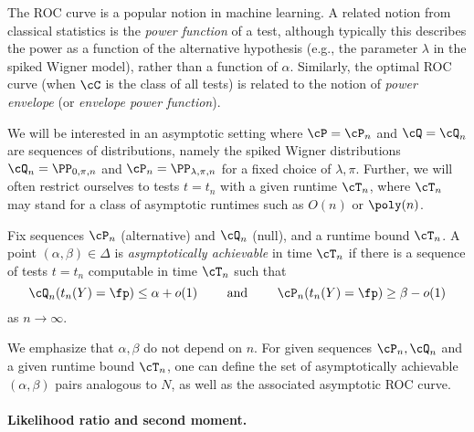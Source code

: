 \documentclass[11pt]{article}
\begin{document}
\begin{remark}[Terminology]
The ROC curve is a popular notion in machine learning. A related notion from classical statistics is the \emph{power function} of a test, although typically this describes the power as a function of the alternative hypothesis (e.g., the parameter $\lambda$ in the spiked Wigner model), rather than a function of $\alpha$. Similarly, the optimal ROC curve (when $\cC$ is the class of all tests) is related to the notion of \emph{power envelope} (or \emph{envelope power function}).
\end{remark}

We will be interested in an asymptotic setting where $\cP = \cP_n$ and $\cQ = \cQ_n$ are sequences of distributions, namely the spiked Wigner distributions $\cQ_n = \PP_{0,\pi,n}$ and $\cP_n = \PP_{\lambda,\pi,n}$ for a fixed choice of $\lambda,\pi$. Further, we will often restrict ourselves to tests $t = t_n$ with a given runtime $\cT_n$, where $\cT_n$ may stand for a class of asymptotic runtimes such as $O(n)$ or $\poly(n)$.

\begin{definition}\label{def:achieve}
Fix sequences $\cP_n$ (alternative) and $\cQ_n$ (null), and a runtime bound $\cT_n$. A point $(\alpha,\beta) \in \Delta$ is \emph{asymptotically achievable} in time $\cT_n$ if there is a sequence of tests $t = t_n$ computable in time $\cT_n$ such that
\[ \cQ_n(t_n(Y) = \fp) \le \alpha + o(1) \qquad\text{ and }\qquad \cP_n(t_n(Y) = \fp) \ge \beta - o(1) \]
as $n \to \infty$.
\end{definition}

\noindent We emphasize that $\alpha,\beta$ do not depend on $n$. For given sequences $\cP_n, \cQ_n$ and a given runtime bound $\cT_n$, one can define the set of asymptotically achievable $(\alpha,\beta)$ pairs analogous to $N$, as well as the associated asymptotic ROC curve.



\paragraph{Likelihood ratio and second moment.}
\end{document}
